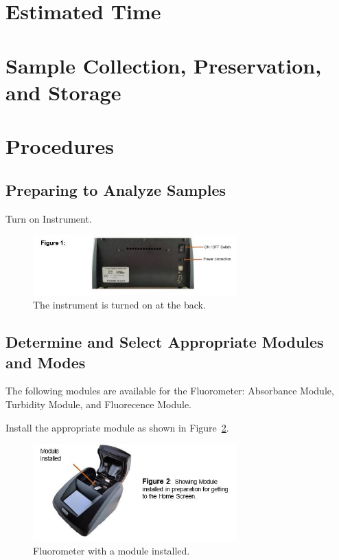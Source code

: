 \documentclass[12pt]{../SOP4_alpha}\usepackage[]{graphicx}\usepackage[]{color}
\begin{document}
\section{Estimated Time}

\section{Sample Collection, Preservation, and Storage}

\section{Procedures}

\subsection{Preparing to Analyze Samples}

\NP Turn on Instrument.

\begin{figure}
  \centering
  \includegraphics[width=0.7\textwidth]{Capture}
  \caption{The instrument is turned on at the back.}
  \label{fig:capture}
\end{figure}

\subsection{Determine and Select Appropriate Modules and Modes}

The following modules are available for the Fluorometer: Absorbance Module, Turbidity Module, and Fluorecence Module. 

\NP Install the appropriate module as shown in Figure~\ref{fig:module}. 

\begin{figure}
  \centering
  \includegraphics[width=0.7\textwidth]{Capture2}
  \caption{Fluorometer with a module installed.}
  \label{fig:module}
\end{figure}
\end{document}
